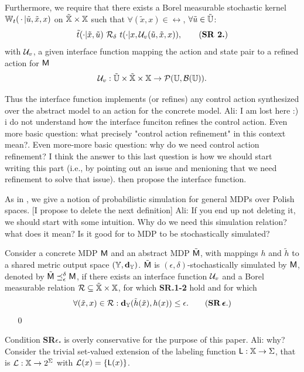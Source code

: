 \documentclass{ifacconf}
\newcommand{\red}[1]{{\color{red} #1}}
\renewcommand{\axx}[1]{{\color{orange} Ali: #1}}
\begin{document}
Furthermore, we require that there exists a Borel measurable stochastic kernel $\mathbb{W}_{t}(\,\cdot\,{\mid} \tilde u,\tilde x,x)$ on $\tilde {{\mathbb{X}}}\times{\mathbb{X}}$ such that $\forall (\tilde x,x)\in \rel$, $\forall \tilde u\in\tilde {{\mathbb{U}}}$:
\begin{equation}\tilde \tr(\cdot| \tilde x, \tilde u)\ \bar \rel_\delta \  \tr(\cdot| x, \InF(\tilde u,\tilde x,x)),\tag{\textbf{SR 2.}}\end{equation} with $\mathcal{U}_{v}$, a given interface function mapping the action and state pair to a refined action for $\mathsf{M}$
\begin{align*}\mathcal{U}_{v}: \tilde {{\mathbb{U}}}\times \tilde {{\mathbb{X}}}\times{\mathbb{X}} \rightarrow \mathcal{P}({\mathbb{U}},\mathcal B({\mathbb{U}})). \end{align*}

Thus the interface function implements (or refines) any control action synthesized over the abstract model to an action for the concrete model.
\axx{I am lost here :) i do not understand how the interface funciton refines the control action. Even more basic question: what precisely "control action refinement" in this context mean?. Even more-more basic question: why do we need control action refinement? I think the answer to this last question is how we should start writing this part  (i.e., by pointing out an issue and menioning that we need refinement to solve that issue). then propose the interface function.}


As in \citep{haesaert2017verification},  we give a notion of probabilistic simulation for  general MDPs over Polish spaces.
%
\red{[I propose to delete the next definition]}
\axx{If you end up not deleting it, we should start with some intuition. Why do we need this simulation relation? what does it mean? Is it good for to MDP to be stochastically simulated?}
\begin{definition}\label{def:apbsim}
Consider a concrete MDP $\mathsf{M}$ and an abstract  MDP $\tilde{\mathsf{M}}$, with mappings $h$ and  $\tilde h$  to a shared {metric} output space  $({\mathbb{Y}},\mathbf{d}_{\mathbb{Y}})$.   
	$\tilde{\mathsf{M}}$ is $(\epsilon,\delta)$-stochastically simulated by $\mathsf{M}$, denoted by $\tilde{\mathsf{M}}\preceq^{\delta}_\epsilon\mathsf{M}$,  if there exists an interface function $\mathcal{U}_{v}$ and
	a Borel measurable relation $\mathcal{R}\subseteq \tilde {{\mathbb{X}}}\times {\mathbb{X}}$, for which \textbf{SR.1-2} hold and for which 
	\begin{equation}
		\forall (\tilde x,x)\in \rel:\mathbf{d}_\Y(\tilde h(\tilde x),h(x))  \leq \epsilon.\tag{\textbf{SR\,$\boldsymbol{\epsilon}$}.}
	\end{equation} 
\mbox{ }	\hfill\mbox{ }\qed
\end{definition}
Condition \textbf{SR$\epsilon$.} is overly conservative for the purpose of this paper. \axx{why?}
Consider the trivial set-valued extension of  the labeling function $\mathsf{L}:{\mathbb{X}}\rightarrow\Sigma$, that is  $\mathcal{L}:{\mathbb{X}}\rightarrow2^\Sigma$ with
 $\mathcal{L}(x)=\{\mathsf{L}(x)\}$.
 
\end{document}
